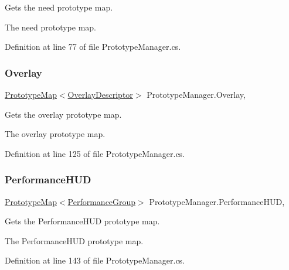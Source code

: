 Gets the need prototype map. 

The need prototype map.

Definition at line 77 of file Prototype\+Manager.\+cs.

\mbox{\label{class_prototype_manager_af27377d0797489482144202f7d376baa}} 
\subsubsection{\texorpdfstring{Overlay}{Overlay}}
{\footnotesize\ttfamily \hyperlink{class_prototype_map}{Prototype\+Map}$<$\hyperlink{class_overlay_descriptor}{Overlay\+Descriptor}$>$ Prototype\+Manager.\+Overlay\hspace{0.3cm}{\ttfamily [static]}, {\ttfamily [get]}}



Gets the overlay prototype map. 

The overlay prototype map.

Definition at line 125 of file Prototype\+Manager.\+cs.

\mbox{\label{class_prototype_manager_af7e92bac47335baac523f475683ed2a8}} 
\subsubsection{\texorpdfstring{Performance\+H\+UD}{PerformanceHUD}}
{\footnotesize\ttfamily \hyperlink{class_prototype_map}{Prototype\+Map}$<$\hyperlink{class_performance_group}{Performance\+Group}$>$ Prototype\+Manager.\+Performance\+H\+UD\hspace{0.3cm}{\ttfamily [static]}, {\ttfamily [get]}}



Gets the Performance\+H\+UD prototype map. 

The Performance\+H\+UD prototype map.

Definition at line 143 of file Prototype\+Manager.\+cs.

\mbox{\label{class_prototype_manager_a28aa7fc2756ccf3e19b09917018f1eac}} 
